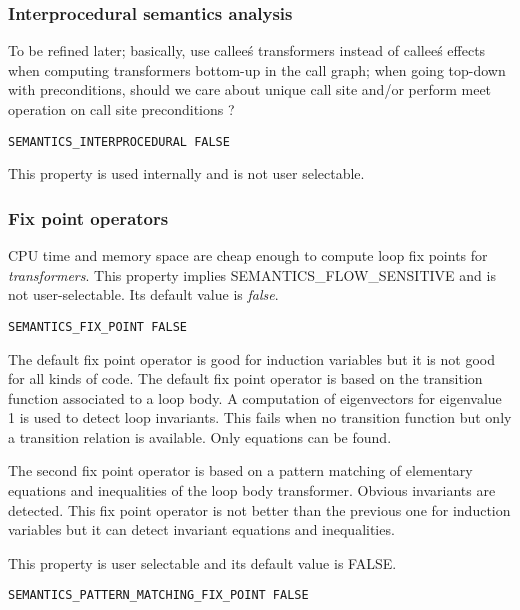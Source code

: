 \subsubsection{Interprocedural semantics analysis}

To be refined later; basically, use callee\'s transformers instead of
callee\'s effects when computing transformers bottom-up in the call graph;
when going top-down with preconditions, should we care about unique
call site and/or perform meet operation on call site preconditions ?

\begin{verbatim}
SEMANTICS_INTERPROCEDURAL FALSE
\end{verbatim}

This property is used internally and is not user selectable.

\subsubsection{Fix point operators}

CPU time and memory space are cheap enough to compute loop fix points for
{\em transformers}. This property implies SEMANTICS\_FLOW\_SENSITIVE and is not
user-selectable. Its default value is {\em false}.

\begin{verbatim}
SEMANTICS_FIX_POINT FALSE
\end{verbatim}

The default fix point operator is good for induction variables but it is
not good for all kinds of code. The default fix point operator is based on
the transition function associated to a loop body. A computation of
eigenvectors for eigenvalue 1 is used to detect loop invariants. This
fails when no transition function but only a transition relation is
available. Only equations can be found.

The second fix point operator is based on a pattern matching of elementary
equations and inequalities of the loop body transformer. Obvious
invariants are detected. This fix point operator is not better than the
previous one for induction variables but it can detect invariant equations
and inequalities.

This property is user selectable and its default value is FALSE.

\begin{verbatim}
SEMANTICS_PATTERN_MATCHING_FIX_POINT FALSE
\end{verbatim}

